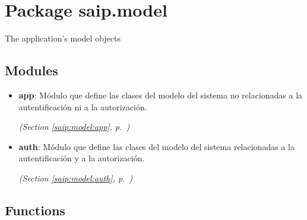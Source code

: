 %
%
%


\section{Package saip.model}

    \label{saip:model}
The application's model objects



\subsection{Modules}

\begin{itemize}
\setlength{\parskip}{0ex}
\item \textbf{app}: Módulo que define las clases del modelo del sistema no relacionadas a la 
autentificación ni a la autorización.



  \textit{(Section \ref{saip:model:app}, p.~\pageref{saip:model:app})}

\item \textbf{auth}: Módulo que define las clases del modelo del sistema relacionadas a la 
autentificación y a la autorización.



  \textit{(Section \ref{saip:model:auth}, p.~\pageref{saip:model:auth})}

\end{itemize}



  \subsection{Functions}

